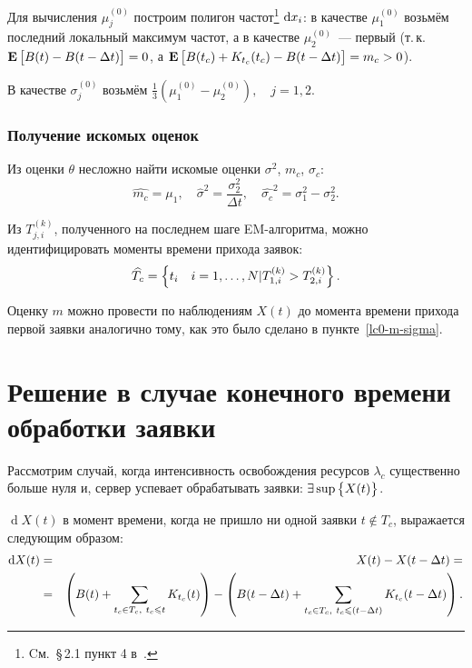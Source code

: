 \documentclass[a4paper,10pt]{article}
\begin{document}
Для вычисления $\mu_j^{(0)}$ построим полигон частот\footnote{%
Cм.~\S\,2.1 пункт 4 в~\cite{ivchmed2010matstat}.
} $\dif x_i$:
в качестве $\mu_1^{(0)}$ возьмём последний локальный максимум частот, 
а в качестве $\mu_2^{(0)}$~--- первый
(т.\,к.~$\mathbf{E}\sbr{B(t) - B(t - \Delta t)} = 0$, 
а $\mathbf{E}\sbr{B(t_c) + K_{t_c}(t_c) - B(t - \Delta t)} = m_c > 0$).

В качестве $\sigma_j^{(0)}$ возьмём $\frac{1}{3}(\mu_1^{(0)} - \mu_2^{(0)}), 
\quad j=1, 2$.

\subsubsection{Получение искомых оценок}
Из оценки $\theta$ несложно найти искомые оценки 
$\sigma^2$, $m_c$, $\sigma_c$:
$$
  \widehat{m_c} = \mu_1, \quad 
  \widehat{\sigma}^2 = \frac{\sigma_2^2}{\Delta t}, \quad
  \widehat{\sigma_c}^2 = \sigma_1^2 - \sigma_2^2.
$$

Из $T_{j,i}^{(k)}$, полученного на последнем шаге EM-алгоритма, 
можно идентифицировать моменты времени прихода заявок:
$$\widehat{T_c} = \cbr{t_i \quad i=1,\ldots,N \vert 
    T_{1,i}^{(k)} > T_{2,i}^{(k)}}.$$

Оценку $m$ можно провести по наблюдениям $X(t)$ до момента времени прихода
первой заявки аналогично тому, как это было сделано в пункте~\ref{lc0-m-sigma}.

\section{Решение в случае конечного времени обработки заявки}
Рассмотрим случай, когда интенсивность освобождения ресурсов $\lambda_c$ 
существенно больше нуля и,
сервер успевает обрабатывать заявки: $\exists \sup\cbr{X(t)}$.

$\operatorname{d}X(t)$ в момент времени, 
когда не пришло ни одной заявки $t \notin T_c$, 
выражается следующим образом:
\begin{eqnarray*}
\dif X(t) 
  & = & X(t) - X(t - \Delta t) = \\
  & = & \del{B(t) + \sum\limits_{t_c \in T_c,\ t_c \leqslant t} K_{t_c}(t)} - 
      \del{B(t - \Delta t) + 
        \sum\limits_{t_c \in T_c,\ t_c \leqslant (t - \Delta t)} 
          K_{t_c}(t - \Delta t)}.
\end{eqnarray*}
\end{document}
